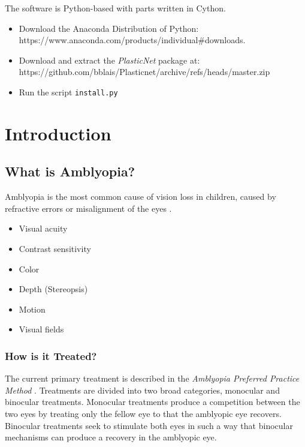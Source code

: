 \documentclass[
  letterpaper,
  number]{elsarticle}
\providecommand{\tightlist}{%
  \setlength{\itemsep}{0pt}\setlength{\parskip}{0pt}}\usepackage{longtable,booktabs,array}
\begin{document}
The software is Python-based with parts written in Cython.

\begin{itemize}
\tightlist
\item
  Download the Anaconda Distribution of Python:
  https://www.anaconda.com/products/individual\#downloads.\\
\item
  Download and extract the \emph{PlasticNet} package at:
  https://github.com/bblais/Plasticnet/archive/refs/heads/master.zip
\item
  Run the script \texttt{install.py}
\end{itemize}

\part{Introduction}

\hypertarget{what-is-amblyopia}{%
\chapter{What is Amblyopia?}\label{what-is-amblyopia}}

Amblyopia is the most common cause of vision loss in children, caused by
refractive errors or misalignment of the eyes \citep{de2007current}.

\begin{itemize}
\tightlist
\item
  Visual acuity
\item
  Contrast sensitivity
\item
  Color
\item
  Depth (Stereopsis)
\item
  Motion
\item
  Visual fields
\end{itemize}

\hypertarget{how-is-it-treated}{%
\section{How is it Treated?}\label{how-is-it-treated}}

The current primary treatment is described in the \emph{Amblyopia
Preferred Practice Method} \citep{wallace2018amblyopia}. Treatments are
divided into two broad categories, monocular and binocular treatments.
Monocular treatments produce a competition between the two eyes by
treating only the fellow eye to that the amblyopic eye recovers.
Binocular treatments seek to stimulate both eyes in such a way that
binocular mechanisms can produce a recovery in the amblyopic eye.
\end{document}
